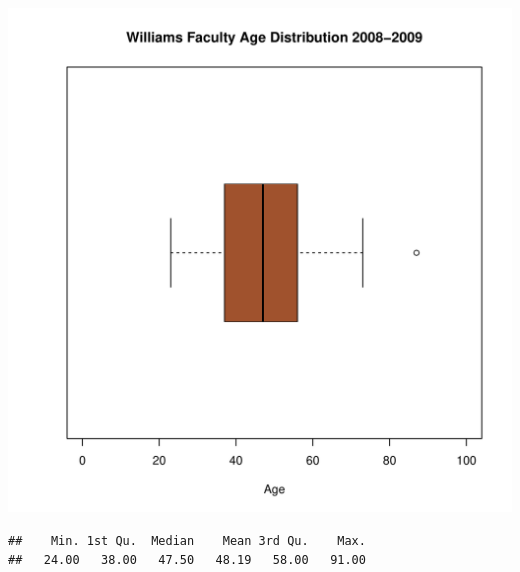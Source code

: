 \documentclass[12pt,a4paper]{article}\usepackage[]{graphicx}\usepackage[]{color}
\makeatletter
\def\maxwidth{ %
  \ifdim\Gin@nat@width>\linewidth
    \linewidth
  \else
    \Gin@nat@width
  \fi
}
\newenvironment{kframe}{%
 \def\at@end@of@kframe{}%
 \ifinner\ifhmode%
  \def\at@end@of@kframe{\end{minipage}}%
  \begin{minipage}{\columnwidth}%
 \fi\fi%
 \def\FrameCommand##1{\hskip\@totalleftmargin \hskip-\fboxsep
 \colorbox{shadecolor}{##1}\hskip-\fboxsep
     \hskip-\linewidth \hskip-\@totalleftmargin \hskip\columnwidth}%
 \MakeFramed {\advance\hsize-\width
   \@totalleftmargin\z@ \linewidth\hsize
   \@setminipage}}%
 {\par\unskip\endMakeFramed%
 \at@end@of@kframe}
\newenvironment{knitrout}{}{} %
\theoremstyle{definition}
\makeatother
\begin{document}
\begin{knitrout}
\color{fgcolor}
\includegraphics[width=\maxwidth]{figure/unnamed-chunk-42-1} 

\end{knitrout}

\begin{knitrout}
\color{fgcolor}\begin{kframe}
\begin{verbatim}
##    Min. 1st Qu.  Median    Mean 3rd Qu.    Max. 
##   24.00   38.00   47.50   48.19   58.00   91.00
\end{verbatim}
\end{kframe}
\end{knitrout}
\end{document}
